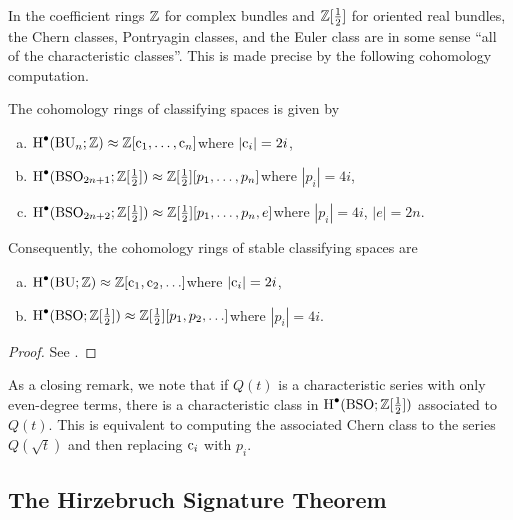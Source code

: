 In the coefficient rings $\mathbb{Z}$ for complex bundles and $\mathbb{Z}[\frac12]$ for oriented real bundles, the Chern classes, Pontryagin classes, and the Euler class are in some sense ``all of the characteristic classes''. This is made precise by the following cohomology computation.

\begin{theorem}\label{thm:universal-cohomology}
	The cohomology rings of classifying spaces is given by
	\begin{enumerate}[(a)]
		\item $\operatorname{H}^\bullet(\mathrm{BU}_n;\mathbb{Z})\approx \mathbb{Z}[\mathrm{c}_1,\ldots, \mathrm{c}_n]$\hfill where $|\mathrm{c}_i|=2i$,
		\item $\operatorname{H}^\bullet(\mathrm{BSO}_{2n+1};\mathbb{Z}[\frac12])\approx \mathbb{Z}[\frac12][p_1,\ldots, p_n]$\hfill where $|p_i|=4i$,
		\item $\operatorname{H}^\bullet(\mathrm{BSO}_{2n+2};\mathbb{Z}[\frac12])\approx \mathbb{Z}[\frac12][p_1,\ldots, p_n, e]$\hfill where $|p_i|=4i$, $|e|=2n$.
	\end{enumerate}
	Consequently, the cohomology rings of stable classifying spaces are 
	\begin{enumerate}[(a)]
		\item $\operatorname{H}^\bullet(\mathrm{BU};\mathbb{Z})\approx \mathbb{Z}[\mathrm{c}_1,\mathrm{c}_2,\ldots]$\hfill where $|\mathrm{c}_i|=2i$,
		\item $\operatorname{H}^\bullet(\mathrm{BSO};\mathbb{Z}[\frac12])\approx \mathbb{Z}[\frac12][p_1,p_2,\ldots]$\hfill where $|p_i|=4i$.
	\end{enumerate}
\end{theorem}
\begin{proof}
	See \cite{toda1987}.
\end{proof}

As a closing remark, we note that if $Q(t)$ is a characteristic series with only even-degree terms, there is a characteristic class in $\operatorname{H}^\bullet(\mathrm{BSO}; \mathbb{Z}[\frac12])$ associated to $Q(t)$. This is equivalent to computing the associated Chern class to the series $Q(\sqrt{t})$ and then replacing $\mathrm{c}_i$ with $p_i$.

\subsection{The Hirzebruch Signature Theorem}

